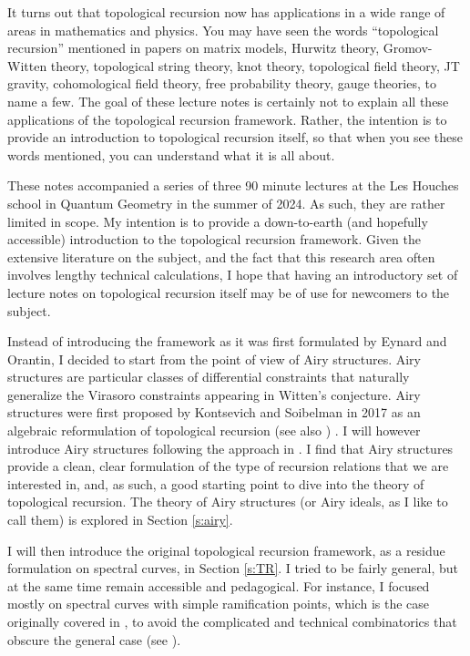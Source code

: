 \documentclass[reqno,oneside,11pt]{amsart}
\theoremstyle{plain}
\theoremstyle{definition}
\theoremstyle{remark}
\numberwithin{equation}{section}
\begin{document}
It turns out that topological recursion now has applications in a wide range of areas in mathematics and physics. You may have seen the words ``topological recursion'' mentioned in papers on matrix models, Hurwitz theory, Gromov-Witten theory, topological string theory, knot theory, topological field theory, JT gravity, cohomological field theory, free probability theory, gauge theories, to name a few. The goal of these lecture notes is certainly not to explain all these applications of the topological recursion framework. Rather, the intention is to provide an introduction to topological recursion itself, so that when you see these words mentioned, you can understand what it is all about.

These notes accompanied a series of three 90 minute lectures at the Les Houches school in Quantum Geometry in the summer of 2024. As such, they are rather limited in scope. My intention is to provide a down-to-earth (and hopefully accessible) introduction to the topological recursion framework. Given the extensive literature on the subject, and the fact that this research area often involves lengthy technical calculations, I hope that having an introductory set of lecture notes on topological recursion itself may be of use for newcomers to the subject.

Instead of introducing the framework as it was first formulated by Eynard and Orantin, I decided to start from the point of view of Airy structures. Airy structures are particular classes of differential constraints that naturally generalize the Virasoro constraints appearing in Witten's conjecture. Airy structures were first proposed by Kontsevich and Soibelman in 2017 as an algebraic reformulation of topological recursion \cite{KS17} (see also \cite{ABCO17}) . I will however introduce Airy structures following the approach in \cite{BCJ22}. I find that Airy structures provide a clean, clear formulation of the type of recursion relations that we are interested in, and, as such, a good starting point to dive into the theory of topological recursion. The theory of Airy structures (or Airy ideals, as I like to call them) is explored in Section \ref{s:airy}.

I will then introduce the original topological recursion framework, as a residue formulation on spectral curves, in Section \ref{s:TR}. I tried to be fairly general, but at the same time remain accessible and pedagogical. For instance, I focused mostly on spectral curves with simple ramification points, which is the case originally covered in \cite{EO07}, to avoid the complicated and technical combinatorics that obscure the general case (see \cite{BE13,BE17,BBCCN18,BKS20,BBCKS23}).
\end{document}
